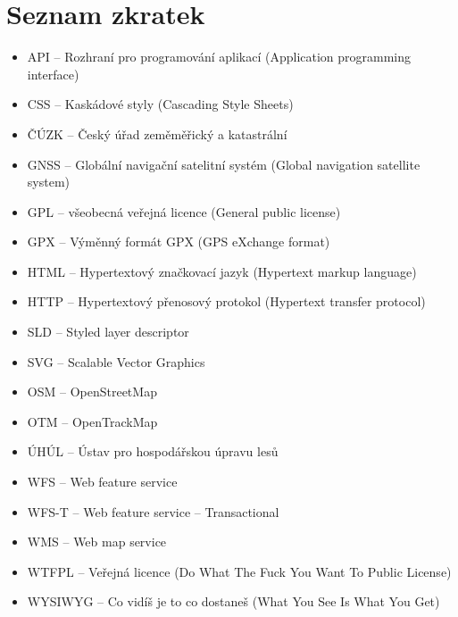 \documentclass[11pt,a4paper,titlepage,oneside]{book}
\begin{document}
\newpage 
\chapter*{Seznam zkratek}
	\begin{itemize}
		\item API -- Rozhraní pro programování aplikací (Application programming interface)
		\item CSS -- Kaskádové styly (Cascading Style Sheets)
		\item ČÚZK -- Český úřad zeměměřický a katastrální
		\item GNSS -- Globální navigační satelitní systém (Global navigation satellite system)
		\item GPL -- všeobecná veřejná licence (General public license)
		\item GPX -- Výměnný formát GPX (GPS eXchange format)
		\item HTML -- Hypertextový značkovací jazyk (Hypertext markup language)
		\item HTTP -- Hypertextový přenosový protokol (Hypertext transfer protocol)
		\item SLD -- Styled layer descriptor
		\item SVG -- Scalable Vector Graphics
		\item OSM -- OpenStreetMap
		\item OTM -- OpenTrackMap
		\item ÚHÚL -- Ústav pro hospodářskou úpravu lesů
		\item WFS -- Web feature service
		\item WFS-T -- Web feature service -- Transactional
		\item WMS -- Web map service
		\item WTFPL -- Veřejná licence  (Do What The Fuck You Want To Public License)
		\item WYSIWYG -- Co vidíš je to co dostaneš (What You See Is What You Get)
	\end{itemize}
\end{document}
